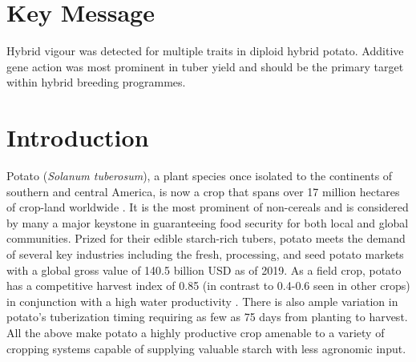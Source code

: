 \section{Key Message}\label{key-message}

Hybrid vigour was detected for multiple traits in diploid hybrid potato. Additive gene action was most prominent in tuber yield and should be the primary target within hybrid breeding programmes.

\newpage

%
%
%
%
%
%
%
%
\linenumbers %



\section{Introduction}

Potato (\emph{Solanum tuberosum}), a plant species once isolated to the continents of southern and central America, is now a crop that spans over 17 million hectares of crop-land worldwide \parencite{faostat2021}. It is the most prominent of non-cereals and is considered by many a major keystone in guaranteeing food security for both local and global communities. Prized for their edible starch-rich tubers, potato meets the demand of several key industries including the fresh, processing, and seed potato markets with a global gross value of 140.5 billion USD as of 2019. As a field crop, potato has a competitive harvest index of 0.85 (in contrast to 0.4-0.6 seen in other crops) in conjunction with a high water productivity \parencite{Hay1995, Lutaladio2009}. There is also ample variation in potato's tuberization timing requiring as few as 75 days from planting to harvest. All the above make potato a highly productive crop amenable to a variety of cropping systems capable of supplying valuable starch with less agronomic input.

